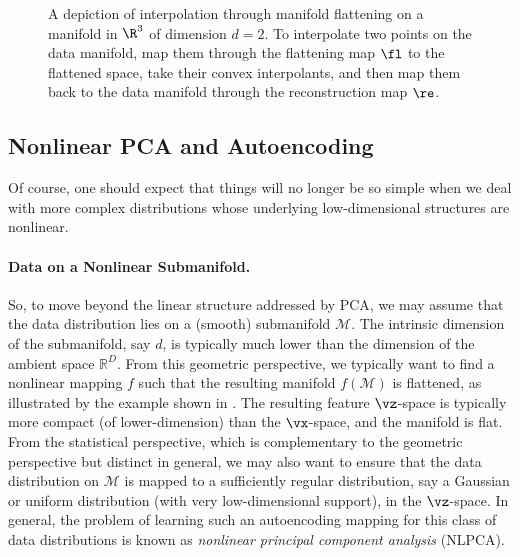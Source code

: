 \documentclass[../../book-main.tex]{subfiles}
\begin{document}
\begin{figure}
  \caption{A depiction of interpolation through manifold flattening
    on a manifold in \(\R^{3}\) of dimension \(d = 2\). To interpolate
    two points on the data manifold, map them through the flattening
    map \(\fl\) to the flattened space, take their convex interpolants,
    and then map them back to the data manifold through the
  reconstruction map \(\re\).}
  \label{fig:idealized_interpolation}
\end{figure}

\subsection{Nonlinear PCA and Autoencoding}\label{sub:nonlinear-pca}\label{sec:NLPCA}
Of course, one should expect that things will no longer be so simple
when we deal with more complex distributions whose underlying
low-dimensional structures are nonlinear.

\paragraph{Data on a Nonlinear Submanifold.} So, to move beyond the
linear structure addressed by PCA, we may assume that the data distribution lies on a (smooth) submanifold $\mathcal{M}$. The intrinsic dimension of the submanifold, say $d$, is typically much lower than the
dimension of the ambient space $\mathbb{R}^D$. From this geometric
perspective, we typically want to find a nonlinear mapping $f$ such that
the resulting manifold
$f(\mathcal{M})$ is flattened, as illustrated by the example shown in
. The resulting feature $\vz$-space
is typically
more compact (of lower-dimension) than the $\vx$-space, and the
manifold is flat.
From the statistical perspective, which is complementary to the geometric
perspective but distinct in general, we may also want to ensure that the data
distribution on $\mathcal{M}$ is mapped to a sufficiently regular
distribution, say a Gaussian or uniform distribution (with 
very low-dimensional support), in the $\vz$-space. 
In general, the problem of learning such an autoencoding mapping for this class
of data distributions is known as {\em nonlinear principal component analysis}
(NLPCA).
\end{document}
